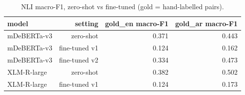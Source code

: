 \begin{table}[t]
\centering
\caption{NLI macro-F1, zero-shot vs fine-tuned (gold = hand-labelled pairs).}
\label{tab:tab_nli}
\begin{tabular}{lrrr}
\toprule
model & setting & gold\_en macro-F1 & gold\_ar macro-F1 \\
\midrule
mDeBERTa-v3 & zero-shot & 0.371 & 0.443 \\
mDeBERTa-v3 & fine-tuned v1 & 0.124 & 0.162 \\
mDeBERTa-v3 & fine-tuned v2 & 0.334 & 0.473 \\
XLM-R-large & zero-shot & 0.382 & 0.502 \\
XLM-R-large & fine-tuned v1 & 0.124 & 0.173 \\
\bottomrule
\end{tabular}
\end{table}
